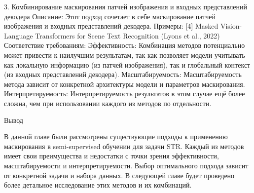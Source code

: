 3. Комбинирование  маскирования  патчей  изображения  и  входных  представлений  декодера
Описание: Этот  подход  сочетает  в  себе  маскирование  патчей  изображения  и  входных  представлений  декодера.
Примеры:
[4] Masked Vision-Language Transformers for Scene Text Recognition (Lyons et al., 2022)
Соответствие требованиям:
Эффективность: Комбинация  методов  потенциально  может  привести  к  наилучшим  результатам,  так  как  позволяет  модели  учитывать  как  локальную  информацию  (из  патчей  изображения),  так  и  глобальный  контекст  (из  входных  представлений  декодера).
Масштабируемость: Масштабируемость  метода  зависит  от  конкретной  архитектуры  модели  и  параметров  маскирования.
Интерпретируемость: Интерпретируемость  результатов  в  этом  случае  ещё  более  сложна,  чем  при  использовании  каждого  из  методов  по  отдельности.

Вывод

В  данной  главе  были  рассмотрены  существующие  подходы  к  применению  маскирования  в  semi-supervised  обучении  для  задачи  STR.  Каждый  из  методов  имеет  свои  преимущества  и  недостатки  с  точки  зрения  эффективности,  масштабируемости  и  интерпретируемости.  Выбор  оптимального  подхода  зависит  от  конкретной  задачи  и  набора  данных.  В  следующей  главе  будет  проведено  более  детальное  исследование  этих  методов  и  их  комбинаций. 

\newpage

